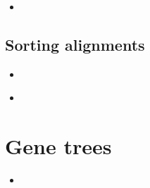 \documentclass[compress, ucs, xelatex, 11pt, xcolor=x11names, aspectratio=1609,
	hyperref={
		bookmarks=true,
		unicode=true,
		colorlinks=true,
		pdftitle={HybSeq course},
		plainpages=false,
		pdfauthor={Vojtech Zeisek},
		pdfsubject={Practical processing of HybSeq target enrichment sequencing data on computing grids like MetaCentrum},
		pdfcreator={XeLaTeX},
		pdfkeywords={BASH, command line, GNU, HybSeq, Linux, MetaCentrum, sequencing shell, target enrichment},
		linkcolor=Cyan2, %
		anchorcolor=Firebrick2, %
		citecolor=Firebrick2, %
		filecolor=Firebrick2, %
		menucolor=Firebrick2, %
		urlcolor=Chartreuse2, %
		pdftex},
	url={hyphens, lowtilde} %
	]{beamer}
\begin{document}
\begin{frame}[fragile]{}
	\begin{itemize}
		\item 
	\end{itemize}
	\begin{spluscode}
    
	\end{spluscode}
	\begin{bashcode}
    
	\end{bashcode}
\end{frame}

\subsection{Sorting alignments}

\begin{frame}[fragile]{}
	\begin{itemize}
		\item 
	\end{itemize}
	\begin{spluscode}
    
	\end{spluscode}
	\begin{bashcode}
    
	\end{bashcode}
\end{frame}

\begin{frame}[fragile]{}
	\begin{itemize}
		\item 
	\end{itemize}
	\begin{spluscode}
    
	\end{spluscode}
	\begin{bashcode}
    
	\end{bashcode}
\end{frame}

\section{Gene trees}

\begin{frame}[fragile]{}
	\begin{itemize}
		\item 
	\end{itemize}
	\begin{spluscode}
    
	\end{spluscode}
	\begin{bashcode}
    
	\end{bashcode}
\end{frame}
\end{document}
